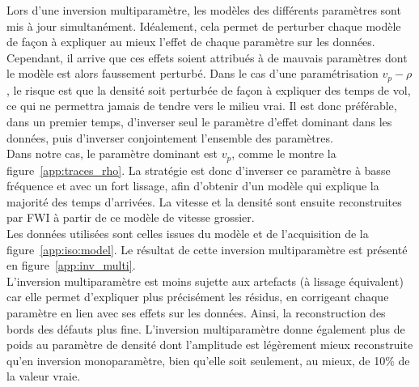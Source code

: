 Lors d'une inversion multiparamètre, les modèles des différents paramètres sont mis à jour simultanément. Idéalement, cela permet de perturber chaque modèle de façon à expliquer au mieux l'effet de chaque paramètre sur les données. Cependant, il arrive que ces effets soient attribués à de mauvais paramètres dont le modèle est alors faussement perturbé. Dans le cas d'une paramétrisation $v_{p}-\rho$, le risque est que la densité soit perturbée de façon à expliquer des temps de vol, ce qui ne permettra jamais de tendre vers le milieu vrai. Il est donc préférable, dans un premier temps, d'inverser seul le paramètre d'effet dominant dans les données, puis d'inverser conjointement l'ensemble des paramètres.\\

 Dans notre cas, le paramètre dominant est $v_{p}$, comme le montre la figure~\ref{app:traces_rho}. La stratégie est donc d'inverser ce paramètre à basse fréquence et avec un fort lissage, afin d'obtenir d'un modèle qui explique la majorité des temps d'arrivées. La vitesse et la densité sont ensuite reconstruites par FWI à partir de ce modèle de vitesse grossier. \\
 
Les données utilisées sont celles issues du modèle et de l'acquisition de la figure~\ref{app:iso:model}.  Le résultat de cette inversion multiparamètre est présenté en figure~\ref{app:inv_multi}. 
\\

L'inversion multiparamètre est moins sujette aux artefacts (à lissage équivalent) car elle permet d'expliquer plus précisément les résidus, en corrigeant chaque paramètre  en lien avec ses effets sur les données. Ainsi, la reconstruction des bords des défauts plus fine.  L'inversion multiparamètre donne également plus de poids au paramètre de densité dont l'amplitude est légèrement mieux reconstruite qu'en inversion monoparamètre, bien qu'elle soit seulement, au mieux, de 10\% de la valeur vraie.




